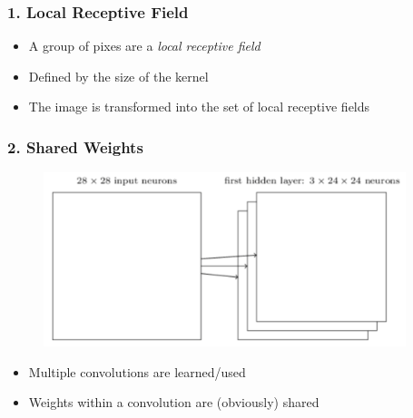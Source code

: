 \documentclass[xcolor={dvipsnames}]{beamer}
\begin{document}
\frame
{
 \frametitle{1. Local Receptive Field}

\begin{figure}
\centering
{}
\end{figure}

\begin{itemize}
\item A group of pixes are a \emph{local receptive field}
\item Defined by the size of the kernel 
\item The image is transformed into the set of local receptive fields
\end{itemize}

}


\frame
{
 \frametitle{2. Shared Weights}

\begin{figure}
\centering
{\includegraphics[height=2in]{stuff/convol8.png}}
\end{figure}

\begin{itemize}
\item Multiple convolutions are learned/used
\item Weights within a convolution are (obviously) shared
\end{itemize}

}
\end{document}
